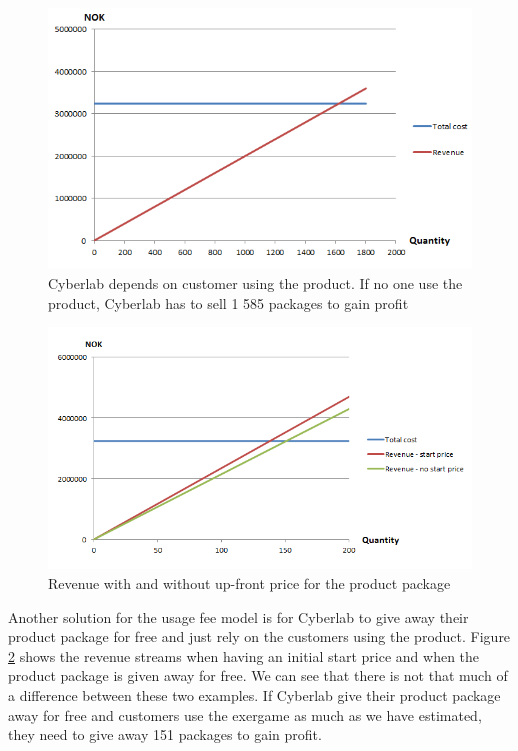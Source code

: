 \begin{figure}
\begin{center}
\includegraphics[scale=0.8]{revenuestreamusage}
\caption[Usage fee example - only sales]{Cyberlab depends on customer using the product. If no one use the product, Cyberlab has to sell 1 585 packages to gain profit}
\label{fig:RevenueStreamUsage}
\end{center}
\end{figure}
\begin{figure}
\begin{center}
\includegraphics[scale=0.8]{usagewithwithoutstartprice}
\caption[Usage fee example]{Revenue with and without up-front price for the product package}
\label{fig:UsageWithWithout}
\end{center}
\end{figure}
Another solution for the usage fee model is for Cyberlab to give away their product package for free and just rely on the customers using the product. Figure \ref{fig:UsageWithWithout} shows the revenue streams when having an initial start price and when the product package is given away for free. We can see that there is not that much of a difference between these two examples. If Cyberlab give their product package away for free and customers use the exergame as much as we have estimated, they need to give away 151 packages    to gain profit. \\ \\

